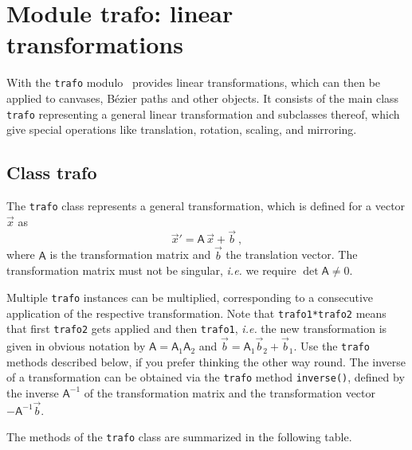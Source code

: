 \chapter{Module trafo: linear transformations}

\label{trafo}

With the  \verb|trafo| modulo \PyX\ provides linear transformations, which can then
be applied to canvases,  B\'ezier paths and other objects. It consists
of the main class \verb|trafo| representing a general linear
transformation and subclasses thereof, which give special operations
like translation, rotation, scaling, and mirroring.

\section{Class trafo}

The \verb|trafo| class represents a general
transformation, which is defined for a vector $\vec{x}$ as
\[
  \vec{x}' = \mathsf{A}\, \vec{x} + \vec{b}\ ,
\]
where $\mathsf{A}$ is the transformation matrix and $\vec{b}$ the
translation vector. The transformation matrix must not be singular,
\textit{i.e.} we require $\det \mathsf{A} \ne 0$.



Multiple \verb|trafo| instances can be multiplied, corresponding to a
consecutive application of the respective transformation. Note that
\verb|trafo1*trafo2| means that first \verb|trafo2| gets applied and
then \verb|trafo1|, \textit{i.e.} the new transformation is given in
obvious notation by $\mathsf{A} = \mathsf{A}_1 \mathsf{A}_2$ and
$\vec{b} = \mathsf{A}_1 \vec{b}_2 + \vec{b}_1$.  Use the \verb|trafo|
methods described below, if you prefer thinking the other way round.
The inverse of a transformation can be obtained via the \verb|trafo|
method \verb|inverse()|, defined by the inverse $\mathsf{A}^{-1}$ of
the transformation matrix and the transformation vector
$-\mathsf{A}^{-1}\vec{b}$.

The methods of the \verb|trafo| class are summarized in the following
table.

